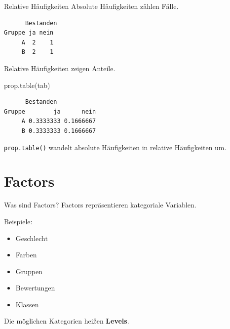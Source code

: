 \documentclass[
  10pt,
  ignorenonframetext,
  aspectratio=169,
]{beamer}
\newenvironment{Shaded}{}{}
\newcommand{\AttributeTok}[1]{\textcolor[rgb]{0.49,0.56,0.16}{#1}}
\newcommand{\FunctionTok}[1]{\textcolor[rgb]{0.02,0.16,0.49}{#1}}
\newcommand{\NormalTok}[1]{#1}
\newcommand{\OtherTok}[1]{\textcolor[rgb]{0.00,0.44,0.13}{#1}}
\newcommand{\SpecialCharTok}[1]{\textcolor[rgb]{0.25,0.44,0.63}{#1}}
\providecommand{\tightlist}{%
  \setlength{\itemsep}{0pt}\setlength{\parskip}{0pt}}
\begin{document}
\begin{frame}[fragile]{Relative Häufigkeiten}
\label{relative-huxe4ufigkeiten}
Absolute Häufigkeiten zählen Fälle.

\begin{Shaded}
\end{Shaded}

\begin{verbatim}
      Bestanden
Gruppe ja nein
     A  2    1
     B  2    1
\end{verbatim}

Relative Häufigkeiten zeigen Anteile.

\begin{Shaded}
\begin{Highlighting}[]
\FunctionTok{prop.table}\NormalTok{(tab)}
\end{Highlighting}
\end{Shaded}

\begin{verbatim}
      Bestanden
Gruppe        ja      nein
     A 0.3333333 0.1666667
     B 0.3333333 0.1666667
\end{verbatim}

\texttt{prop.table()} wandelt absolute Häufigkeiten in relative
Häufigkeiten um.
\end{frame}

\section{Factors}\label{factors}

\begin{frame}{Was sind Factors?}
\label{was-sind-factors}
Factors repräsentieren kategoriale Variablen.

Beispiele:

\begin{itemize}
\tightlist
\item
  Geschlecht
\item
  Farben
\item
  Gruppen
\item
  Bewertungen
\item
  Klassen
\end{itemize}

Die möglichen Kategorien heißen \textbf{Levels}.
\end{frame}
\end{document}

